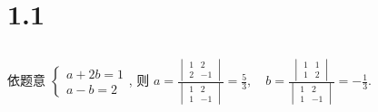\section{1.1}
 \subsection{} %


	 \paragraph{} %
		 依题意
		 $\begin{cases}
				 a + 2b = 1 \\
				 a - b = 2
			 \end{cases}$,
		 则
		 $a = \frac{\begin{vmatrix}
					 1 & 2  \\
					 2 & -1
				 \end{vmatrix}}
			 {\begin{vmatrix}
					 1 & 2  \\
					 1 & -1
				 \end{vmatrix}} = \frac{5}{3}, \quad
			 b = \frac{\begin{vmatrix}
					 1 & 1 \\
					 1 & 2
				 \end{vmatrix}}
			 {\begin{vmatrix}
					 1 & 2  \\
					 1 & -1
				 \end{vmatrix}} = -\frac{1}{3}$.


